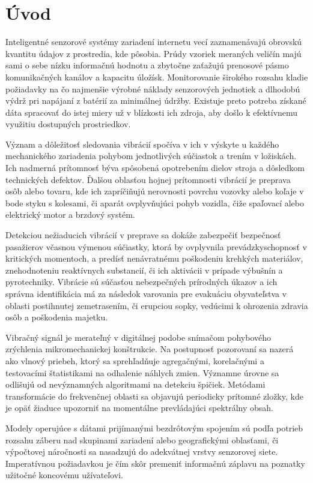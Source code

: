 \chapter{Úvod}
Inteligentné senzorové systémy zariadení internetu vecí zaznamenávajú obrovskú kvantitu údajov z prostredia, kde
pôsobia. Prúdy vzoriek meraných veličín majú sami o sebe nízku informačnú hodnotu a zbytočne zaťažujú
prenosové pásmo komunikačných kanálov a kapacitu úložísk. Monitorovanie širokého rozsahu kladie požiadavky
na čo najmenšie výrobné náklady senzorových jednotiek a dlhodobú výdrž pri napájaní z batérií za minimálnej údržby.
Existuje preto potreba získané dáta spracovať do istej miery už v blízkosti ich zdroja, aby došlo k efektívnemu
využitiu dostupných prostriedkov.

Význam a dôležitosť sledovania vibrácií spočíva v ich v výskyte u každého mechanického zariadenia pohybom jednotlivých súčiastok
a trením v ložiskách. Ich nadmerná prítomnosť býva spôsobená opotrebením dielov stroja a dôsledkom technických defektov. 
Ďalšou oblasťou hojnej prítomnosti vibrácií je preprava osôb alebo tovaru, kde ich zapríčiňujú nerovnosti povrchu vozovky 
alebo koľaje v bode styku s kolesami, či aparát ovplyvňujúci pohyb vozidla, čiže spaľovací alebo elektrický motor a brzdový systém.

Detekciou nežiaducich vibrácií v preprave sa dokáže zabezpečiť bezpečnosť pasažierov včasnou výmenou súčiastky,
ktorá by ovplyvnila prevádzkyschopnosť v kritických momentoch, a predísť nenávratnému poškodeniu krehkých materiálov,
znehodnoteniu reaktívnych substancií, či ich aktivácii v prípade výbušnín a pyrotechniky. Vibrácie sú súčasťou
nebezpečných prírodných úkazov a ich správna identifikácia má za následok varovania pre evakuáciu obyvateľstva
v oblasti postihnutej zemetrasením, či erupciou sopky, vedúcimi k ohrozenia zdravia osôb a poškodenia majetku.

Vibračný signál je merateľný v digitálnej podobe snímačom pohybového zrýchlenia mikromechanickej konštrukcie. 
Na postupnosť pozorovaní sa nazerá ako vlnový priebeh, ktorý sa sprehľadňuje agregačnými, korelačnými a testovacími 
štatistikami na odhalenie náhlych zmien. Významne úrovne sa odlišujú od nevýznamných algoritmami na detekciu špičiek.
Metódami transformácie do frekvenčnej oblasti sa objavujú periodicky prítomné zložky, kde je opäť žiaduce upozorniť 
na momentálne prevládajúci spektrálny obsah. 

Modely operujúce s dátami prijímanými bezdrôtovým spojením sú podľa  potrieb rozsahu záberu nad skupinami zariadení alebo geografickými oblasťami, či výpočtovej náročnosti sa nasadzujú do adekvátnej vrstvy senzorovej siete. Imperatívnou požiadavkou je čím skôr 
premeniť informačnú záplavu na poznatky užitočné koncovému užívateľovi.
